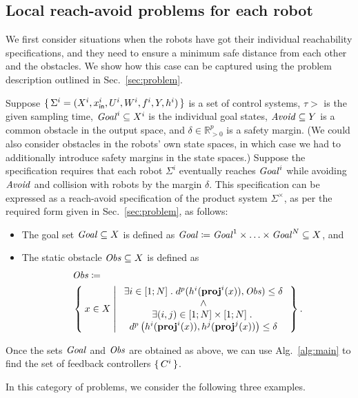 \subsection{Local reach-avoid problems for each robot}
\label{sec:local reach-avoid}

We first consider situations when the robots have got their individual reachability specifications, and they need to ensure a minimum safe distance from each other and the obstacles.
We show how this case can be captured using the problem description outlined in Sec.~\ref{sec:problem}.

Suppose $\set{\Sigma^i=(X^i,x_{\mathsf{in}}^i,U^i,W^i,f^i,Y,h^i)}$ is a set of control systems, $\tau>$ is the given sampling time, $\mathit{Goal}^i\subseteq X^i$ is the individual goal states, $\mathit{Avoid}\subseteq Y$ is a common obstacle in the output space, and $\delta \in \mathbb{R}^p_{>0}$ is a safety margin.
(We could also consider obstacles in the robots' own state spaces, in which case we had to additionally introduce safety margins in the state spaces.)
Suppose the specification requires that each robot $\Sigma^i$ eventually reaches $\mathit{Goal}^i$ while avoiding $\mathit{Avoid}$ and collision with robots by the margin $\delta$.
This specification can be expressed as a reach-avoid specification of the product system $\Sigma^\times$, as per the required form given in Sec.~\ref{sec:problem}, as follows:
\begin{itemize}
	\item The goal set $\mathit{Goal}\subseteq X$ is defined as $\mathit{Goal} \coloneqq \mathit{Goal}^1\times \ldots \times \mathit{Goal}^N \subseteq X$, and
	\item The static obstacle $\mathit{Obs}\subseteq X$ is defined as 
		\begin{align}
			&\mathit{Obs} \coloneqq\\ 
				&\Set{ x\in X | 
					\begin{array}{c}
						\exists i\in [1;N]\;.\; d^{p}(h^i(\mathbf{proj}^i(x)),\mathit{Obs}) \leq \delta\\
						\wedge\\
						 \exists (i,j)\in [1;N]\times [1;N]\;.\;\\ d^{p}\left(h^i(\mathbf{proj}^i(x)),h^j(\mathbf{proj}^j(x))\right)\leq\delta
					\end{array}}.
		\end{align}
\end{itemize}
Once the sets $\mathit{Goal}$ and $\mathit{Obs}$ are obtained as above, we can use Alg.~\ref{alg:main} to find the set of feedback controllers $\set{C^i}$.

In this category of problems, we consider the following three examples.

